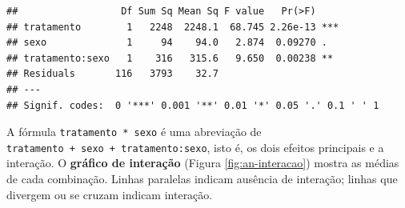 \documentclass[
]{book}
\begin{document}
\begin{verbatim}
##                  Df Sum Sq Mean Sq F value   Pr(>F)    
## tratamento        1   2248  2248.1  68.745 2.26e-13 ***
## sexo              1     94    94.0   2.874  0.09270 .  
## tratamento:sexo   1    316   315.6   9.650  0.00238 ** 
## Residuals       116   3793    32.7                     
## ---
## Signif. codes:  0 '***' 0.001 '**' 0.01 '*' 0.05 '.' 0.1 ' ' 1
\end{verbatim}

A fórmula \texttt{tratamento\ *\ sexo} é uma abreviação de \texttt{tratamento\ +\ sexo\ +\ tratamento:sexo}, isto é, os dois efeitos principais e a interação. O \textbf{gráfico de interação} (Figura \ref{fig:an-interacao}) mostra as médias de cada combinação. Linhas paralelas indicam ausência de interação; linhas que divergem ou se cruzam indicam interação.
\end{document}

